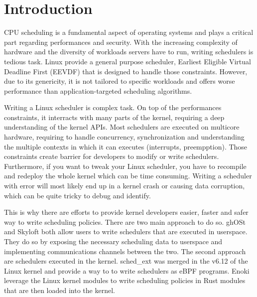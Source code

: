 \section{Introduction}

\par CPU scheduling is a fundamental aspect of operating systems and plays a critical part regarding performances and security. With the increasing complexity of hardware and the diversity of workloads servers have to run, writing schedulers is tedious task. Linux provide a general purpose scheduler, Earliest Eligible Virtual Deadline First (EEVDF)\cite{eevdf} that is designed to handle those constraints. However, due to its genericity, it is not tailored to specific workloads and offers worse performance than application-targeted scheduling algorithms\cite{ghost,shenango}. \newline

\par Writing a Linux scheduler is complex task. On top of the performances constraints, it interracts with many parts of the kernel, requiring a deep understanding of the kernel APIs. Most schedulers are executed on multicore hardware, requiring to handle concurrency, synchronization and understanding the multiple contexts in which it can executes (interrupts, preempption). Those constraints create barrier for developers to modify or write schedulers. Furthermore, if you want to tweak your Linux scheduler, you have to recompile and redeploy the whole kernel which can be time consuming. Writing a scheduler with error will most likely end up in a kernel crash or causing data corruption, which can be quite tricky to debug and identify. \newline

\par This is why there are efforts to provide kernel developers easier, faster and safer way to write scheduling policies. There are two main approach to do so. ghOSt\cite{ghost} and Skyloft\cite{skyloft} both allow users to write schedulers that are executed in userspace. They do so by exposing the necessary scheduling data to userspace and implementing communications channels between the two. The second approach are schedulers executed in the kernel. sched\_ext\cite{schedext} was merged in the v6.12 of the Linux kernel and provide a way to to write schedulers as eBPF\cite{ebpf} programs. Enoki\cite{enoki} leverage the Linux kernel modules to write scheduling policies in Rust modules that are then loaded into the kernel.\newline

